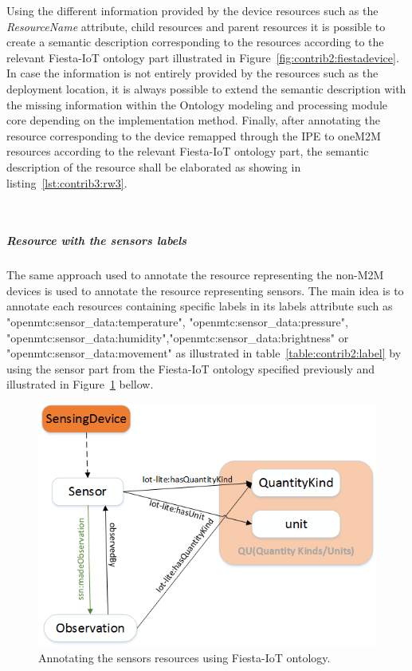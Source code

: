 Using the different information provided by the device resources such as the \textit{ResourceName} attribute, child resources and parent resources it is possible to create a semantic description corresponding to the resources according to the relevant Fiesta-IoT ontology part illustrated in Figure~\ref{fig:contrib2:fiestadevice}. In case the information is not entirely provided by the resources such as the deployment location, it is always possible to extend the semantic description with the missing information within the Ontology modeling and processing module core depending on the implementation method. Finally, after annotating the resource corresponding to the device remapped through the IPE to oneM2M resources according to the relevant Fiesta-IoT ontology part, the semantic description of the resource shall be elaborated as showing in listing~\ref{lst:contrib3:rw3}. 

\lstset{caption=the semantic description of the resource corresponding to the non-M2M device, label=lst:contrib3:rw3,
language=xml, breaklines=true, numbers=left, basicstyle=\small\ttfamily,
stepnumber=1, frame=single, inputencoding=utf8/latin1}~

\subparagraph*{Resource with the sensors labels }
\par 
The same approach used to annotate the resource representing the non-M2M devices is used to annotate the resource representing sensors. The main idea is to annotate each resources containing specific labels in its labels attribute such as "openmtc:sensor\_data:temperature", "openmtc:sensor\_data:pressure", "openmtc:sensor\_data:humidity","openmtc:sensor\_data:brightness" or "openmtc:sensor\_data:movement" as illustrated in table~\ref{table:contrib2:label} by using the sensor part from the Fiesta-IoT ontology specified previously and illustrated in Figure~\ref{fig:contrib2:fiestasensor} bellow. 

\begin{figure}[htbp]
    \centering
    \includegraphics[width=.7\textwidth]{resources/images/sensor}
    \caption{Annotating the sensors resources using Fiesta-IoT ontology. }\label{fig:contrib2:fiestasensor}
\end{figure}

